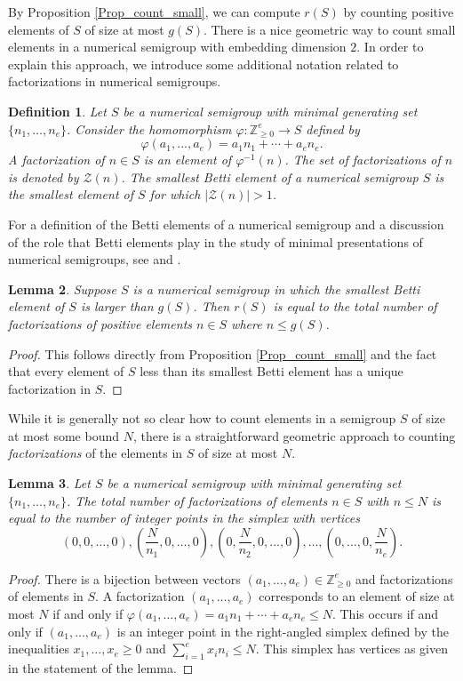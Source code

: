 \documentclass[12pt]{amsart}
\newcommand{\Z}{{\mathbb Z}}
\theoremstyle{plain}\newtheorem{proposition}{Proposition}[section]
\newtheorem{defn}[proposition]{Definition}
\newtheorem{lemma}[proposition]{Lemma}
\begin{document}
By Proposition \ref{Prop_count_small}, we can compute $r(S)$ by counting positive elements of $S$ of size at most $g(S)$.  There is a nice geometric way to count small elements in a numerical semigroup with embedding dimension $2$.  In order to explain this approach, we introduce some additional notation related to factorizations in numerical semigroups.

\begin{defn}
Let $S$ be a numerical semigroup with minimal generating set $\{n_1,\ldots, n_e\}$.  Consider the homomorphism $\varphi\colon \Z_{\ge 0}^e \rightarrow S$ defined by 
\[
\varphi(a_1, \ldots, a_e) = a_1 n_1 +\cdots + a_e n_e.
\]  
A \emph{factorization} of $n \in S$ is an element of $\varphi^{-1}(n)$.  The \emph{set of factorizations} of $n$ is denoted by $\mathcal{Z}(n)$. The \emph{smallest Betti element} of a numerical semigroup $S$ is the smallest element of $S$ for which $|\mathcal{Z}(n)| > 1$.  
\end{defn}
\noindent For a definition of the Betti elements of a numerical semigroup and a discussion of the role that Betti elements play in the study of minimal presentations of numerical semigroups, see \cite[Chapter 7]{GarciaSanchez_Rosales} and \cite{GSOR}.

\begin{lemma}\label{lem_large_Betti}
Suppose $S$ is a numerical semigroup in which the smallest Betti element of $S$ is larger than $g(S)$.  Then $r(S)$ is equal to the total number of factorizations of positive elements $n \in S$ where $n \le g(S)$.
\end{lemma}
\begin{proof}
This follows directly from Proposition \ref{Prop_count_small} and the fact that every element of $S$ less than its smallest Betti element has a unique factorization in $S$.
\end{proof}

While it is generally not so clear how to count elements in a semigroup $S$ of size at most some bound $N$, there is a straightforward geometric approach to counting \emph{factorizations} of the elements in $S$ of size at most $N$.
\begin{lemma}\label{lem_int_points}
Let $S$ be a numerical semigroup with minimal generating set $\{n_1,\ldots, n_e\}$.  The total number of factorizations of elements $n \in S$ with $n \le N$ is equal to the number of integer points in the simplex with vertices
\[
\left(0,0,\ldots, 0\right), \left(\frac{N}{n_1},0,\ldots, 0 \right),\left(0,\frac{N}{n_2},0,\ldots, 0 \right),\ldots, \left(0,\ldots, 0,\frac{N}{n_e} \right).
\]
\end{lemma}
\begin{proof}
There is a bijection between vectors $(a_1,\ldots, a_e) \in \Z_{\ge 0}^e$ and factorizations of elements in $S$.  A factorization $(a_1,\ldots, a_e)$ corresponds to an element of size at most $N$ if and only if $\varphi(a_1,\ldots, a_e) = a_1 n_1 + \cdots + a_e n_e \le N$.  This occurs if and only if $(a_1,\ldots, a_e)$ is an integer point in the right-angled simplex defined by the inequalities $x_1,\ldots, x_e \ge 0$ and $\sum\limits_{i=1}^e x_i n_i \le N$.  This simplex has vertices as given in the statement of the lemma.
\end{proof}
\end{document}
